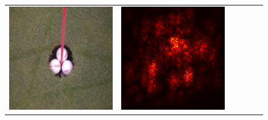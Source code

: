 \documentclass[preprint,12pt]{elsarticle}
\begin{document}
\begin{figure}[p]
\begin{tabular}{cccccc}
  \includegraphics[scale=\scale]{../visualizations/examples/imagenette/cnn/images/5.png} &
  \includegraphics[scale=\scale]{../visualizations/examples/imagenette/cnn/saliency_map/5.png} & 

\end{tabular}
\end{figure}
\end{document}
